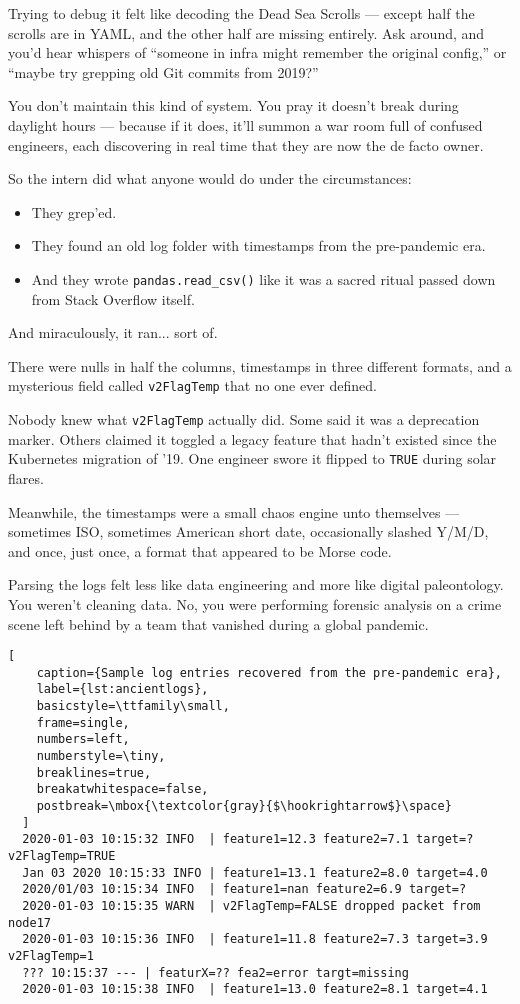 Trying to debug it felt like decoding the Dead Sea Scrolls — except half the scrolls are in YAML, and the other half are missing entirely. Ask around, and you’d hear whispers of “someone in infra might remember the original config,” or “maybe try grepping old Git commits from 2019?”

You don’t maintain this kind of system. You pray it doesn’t break during daylight hours — because if it does, it’ll summon a war room full of confused engineers, each discovering in real time that they are now the de facto owner.

So the intern did what anyone would do under the circumstances:

\begin{itemize}
	\item They grep’ed.
	\item They found an old log folder with timestamps from the pre-pandemic era.
	\item And they wrote \texttt{pandas.read\_csv()} like it was a sacred ritual passed down from Stack Overflow itself.
\end{itemize}

And miraculously, it ran... sort of.

There were nulls in half the columns, timestamps in three different formats, and a mysterious field called \texttt{v2FlagTemp} that no one ever defined.

Nobody knew what \texttt{v2FlagTemp} actually did. Some said it was a deprecation marker. Others claimed it toggled a legacy feature that hadn’t existed since the Kubernetes migration of ’19. One engineer swore it flipped to \texttt{TRUE} during solar flares.

Meanwhile, the timestamps were a small chaos engine unto themselves — sometimes ISO, sometimes American short date, occasionally slashed Y/M/D, and once, just once, a format that appeared to be Morse code.

Parsing the logs felt less like data engineering and more like digital paleontology. You weren’t cleaning data. No, you were performing forensic analysis on a crime scene left behind by a team that vanished during a global pandemic.

\begin{lstlisting}[
    caption={Sample log entries recovered from the pre-pandemic era},
    label={lst:ancientlogs},
    basicstyle=\ttfamily\small,
    frame=single,
    numbers=left,
    numberstyle=\tiny,
    breaklines=true,
    breakatwhitespace=false,
    postbreak=\mbox{\textcolor{gray}{$\hookrightarrow$}\space}
  ]
  2020-01-03 10:15:32 INFO  | feature1=12.3 feature2=7.1 target=? v2FlagTemp=TRUE
  Jan 03 2020 10:15:33 INFO | feature1=13.1 feature2=8.0 target=4.0
  2020/01/03 10:15:34 INFO  | feature1=nan feature2=6.9 target=?
  2020-01-03 10:15:35 WARN  | v2FlagTemp=FALSE dropped packet from node17
  2020-01-03 10:15:36 INFO  | feature1=11.8 feature2=7.3 target=3.9 v2FlagTemp=1
  ??? 10:15:37 --- | featurX=?? fea2=error targt=missing
  2020-01-03 10:15:38 INFO  | feature1=13.0 feature2=8.1 target=4.1
  \end{lstlisting}
  

